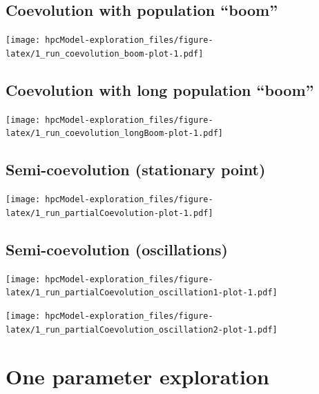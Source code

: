 \documentclass[
]{book}
\begin{document}
\newpage

\hypertarget{coevolution-with-population-boom}{%
\section{Coevolution with population ``boom''}\label{coevolution-with-population-boom}}

\texttt{[image: hpcModel-exploration\_files/figure-latex/1\_run\_coevolution\_boom-plot-1.pdf]}

\newpage

\hypertarget{coevolution-with-long-population-boom}{%
\section{Coevolution with long population ``boom''}\label{coevolution-with-long-population-boom}}

\texttt{[image: hpcModel-exploration\_files/figure-latex/1\_run\_coevolution\_longBoom-plot-1.pdf]}

\newpage

\hypertarget{semi-coevolution-stationary-point}{%
\section{Semi-coevolution (stationary point)}\label{semi-coevolution-stationary-point}}

\texttt{[image: hpcModel-exploration\_files/figure-latex/1\_run\_partialCoevolution-plot-1.pdf]}

\newpage

\hypertarget{semi-coevolution-oscillations}{%
\section{Semi-coevolution (oscillations)}\label{semi-coevolution-oscillations}}

\texttt{[image: hpcModel-exploration\_files/figure-latex/1\_run\_partialCoevolution\_oscillation1-plot-1.pdf]}

\texttt{[image: hpcModel-exploration\_files/figure-latex/1\_run\_partialCoevolution\_oscillation2-plot-1.pdf]}

\hypertarget{one-parameter-exploration}{%
\chapter{One parameter exploration}\label{one-parameter-exploration}}

\newpage
\end{document}
